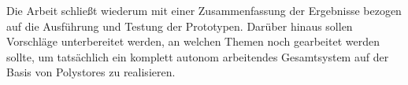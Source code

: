 \begin{otherlanguage}{american}
	\noindent
	Die Arbeit schließt wiederum mit einer Zusammenfassung der Ergebnisse bezogen auf die Ausführung
	und Testung der Prototypen.
	Darüber hinaus sollen Vorschläge unterbereitet werden, an welchen Themen noch gearbeitet werden sollte,
	um tatsächlich ein komplett autonom arbeitendes Gesamtsystem auf der Basis von Polystores zu realisieren.


\end{otherlanguage}

